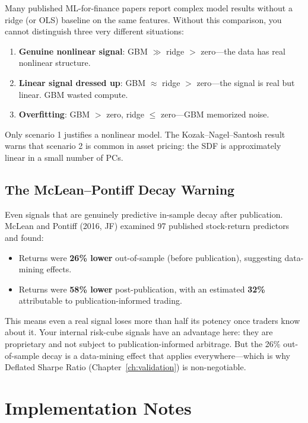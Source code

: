 \begin{warning}
Many published ML-for-finance papers report complex model results without a ridge (or OLS) baseline on the same features.
Without this comparison, you cannot distinguish three very different situations:
\begin{enumerate}[nosep]
  \item \textbf{Genuine nonlinear signal}: GBM $\gg$ ridge $>$ zero---the data has real nonlinear structure.
  \item \textbf{Linear signal dressed up}: GBM $\approx$ ridge $>$ zero---the signal is real but linear. GBM wasted compute.
  \item \textbf{Overfitting}: GBM $>$ zero, ridge $\leq$ zero---GBM memorized noise.
\end{enumerate}
Only scenario 1 justifies a nonlinear model.
The Kozak--Nagel--Santosh result warns that scenario 2 is common in asset pricing: the SDF is approximately linear in a small number of PCs.
\end{warning}

\subsection{The McLean--Pontiff Decay Warning}

Even signals that are genuinely predictive in-sample decay after publication.
McLean and Pontiff (2016, JF) examined 97 published stock-return predictors and found:
\begin{itemize}[nosep]
  \item Returns were \textbf{26\% lower} out-of-sample (before publication), suggesting data-mining effects.
  \item Returns were \textbf{58\% lower} post-publication, with an estimated \textbf{32\%} attributable to publication-informed trading.
\end{itemize}
This means even a real signal loses more than half its potency once traders know about it.
Your internal risk-cube signals have an advantage here: they are proprietary and not subject to publication-informed arbitrage.
But the 26\% out-of-sample decay is a data-mining effect that applies everywhere---which is why Deflated Sharpe Ratio (Chapter~\ref{ch:validation}) is non-negotiable.

\section{Implementation Notes}
\label{sec:ridge-implementation}

